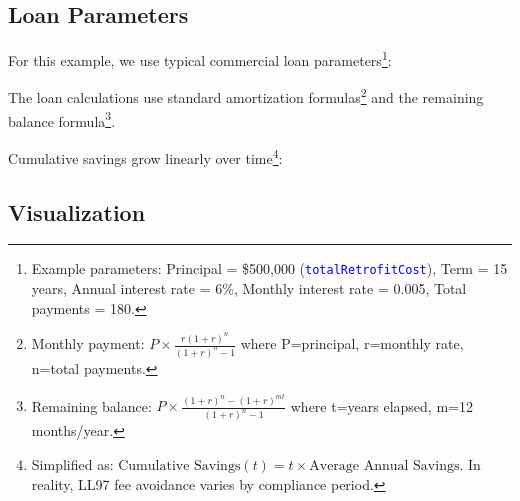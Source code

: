 \documentclass{article}
\newcommand{\code}[1]{\textcolor{blue}{\texttt{#1}}}
\begin{document}
\subsection{Loan Parameters}

For this example, we use typical commercial loan parameters\footnote{Example parameters: Principal = \$500,000 (\code{totalRetrofitCost}), Term = 15 years, Annual interest rate = 6\%, Monthly interest rate = 0.005, Total payments = 180.}:

The loan calculations use standard amortization formulas\footnote{Monthly payment: $P \times \frac{r(1+r)^n}{(1+r)^n-1}$ where P=principal, r=monthly rate, n=total payments.} and the remaining balance formula\footnote{Remaining balance: $P \times \frac{(1+r)^n-(1+r)^{mt}}{(1+r)^n-1}$ where t=years elapsed, m=12 months/year.}. 

Cumulative savings grow linearly over time\footnote{Simplified as: $\text{Cumulative Savings}(t) = t \times \text{Average Annual Savings}$. In reality, LL97 fee avoidance varies by compliance period.}:

\subsection{Visualization}
\end{document}
